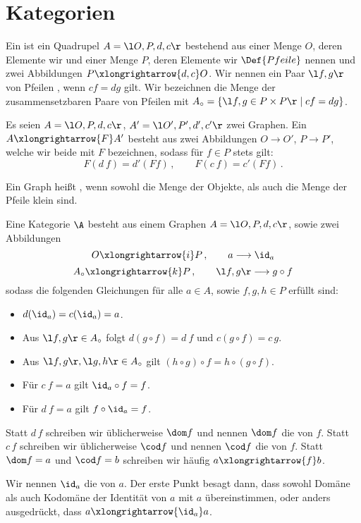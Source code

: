 \section{Kategorien}

Ein  ist ein Quadrupel $A=\l O,P,d,c \r $ bestehend aus einer Menge $O$, deren Elemente wir  und einer Menge $P$, deren Elemente wir $\Def{Pfeile}$ nennen und zwei Abbildungen $P\xlongrightarrow{d,c}O$. Wir nennen ein Paar $\l f,g\r$ von Pfeilen , wenn $cf=dg$ gilt. Wir bezeichnen die Menge der zusammensetzbaren Paare von Pfeilen mit $A_\circ=\left\{\l f,g\in P\times P\r\mid cf=dg \right\}$.

Es seien $A=\l O,P,d,c \r $, $A'=\l O',P',d',c' \r $ zwei Graphen. Ein  $A\xlongrightarrow{F} A'$ besteht aus zwei Abbildungen $O\longrightarrow O'$, $P\longrightarrow P'$, welche wir beide mit $F$ bezeichnen, sodass für $f\in P$ stets gilt:
\[F(d\ f)=d'(Ff)\,,\qquad F(c\ f)=c'(Ff)\,. \]

Ein Graph heißt , wenn sowohl die Menge der Objekte, als auch die Menge der Pfeile klein sind.

Eine Kategorie $\A$ besteht aus einem Graphen $A=\l O,P,d,c\r$, sowie zwei Abbildungen
\[O\xlongrightarrow{i} P\,,\qquad a\longrightarrow \id_a\]
\[A_\circ\xlongrightarrow{k}P\,,\qquad \l f,g\r\longrightarrow g\circ f\]
sodass die folgenden Gleichungen für alle $a\in A$, sowie $f,g,h\in P$ erfüllt sind:
\begin{itemize}
\item $d(\id_a)=c(\id_a)=a$.
\item Aus $\l f,g\r\in A_\circ$ folgt $d(g\circ f)=d\ f$ und $c(g\circ f)=c\,g$.
\item Aus $\l f,g\r,\l g,h\r\in A_\circ$ gilt $(h\circ g)\circ f=h\circ(g\circ f)$.
\item Für $c\ f=a$ gilt $\id_a\circ f=f$.
\item Für $d\ f=a$ gilt $f\circ \id_a=f$.
\end{itemize}
Statt $d\, f$ schreiben wir üblicherweise $\dom f$ und nennen $\dom f$ die  von $f$. Statt $c\, f$ schreiben wir üblicherweise $\cod f$ und nennen $\cod f$ die  von $f$. Statt $\dom f=a$ und $\cod f=b$ schreiben wir häufig $a\xlongrightarrow{f}b$.

Wir nennen $\id_a$ die  von $a$. Der erste Punkt besagt dann, dass sowohl Domäne als auch Kodomäne der Identität von $a$ mit $a$ übereinstimmen, oder anders ausgedrückt, dass $a\xlongrightarrow{\id_a}a$.

